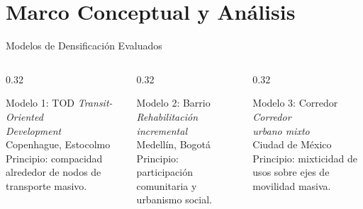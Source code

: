 
\section{Marco Conceptual y Análisis}

\begin{frame}{Modelos de Densificación Evaluados}
  \begin{columns}[T]
    \begin{column}{0.32\textwidth}
      \begin{block}{Modelo 1: TOD}
        \textit{Transit-Oriented\\Development}\\[0.2cm]
        Copenhague, Estocolmo\\[0.1cm]
        {\small Principio: compacidad alrededor de nodos de transporte masivo.}
      \end{block}
    \end{column}
    \begin{column}{0.32\textwidth}
      \begin{block}{Modelo 2: Barrio}
        \textit{Rehabilitación\\incremental}\\[0.2cm]
        Medellín, Bogotá\\[0.1cm]
        {\small Principio: participación comunitaria y urbanismo social.}
      \end{block}
    \end{column}
    \begin{column}{0.32\textwidth}
      \begin{block}{Modelo 3: Corredor}
        \textit{Corredor\\urbano mixto}\\[0.2cm]
        Ciudad de México\\[0.1cm]
        {\small Principio: mixticidad de usos sobre ejes de movilidad masiva.}
      \end{block}
    \end{column}
  \end{columns}
\end{frame}

